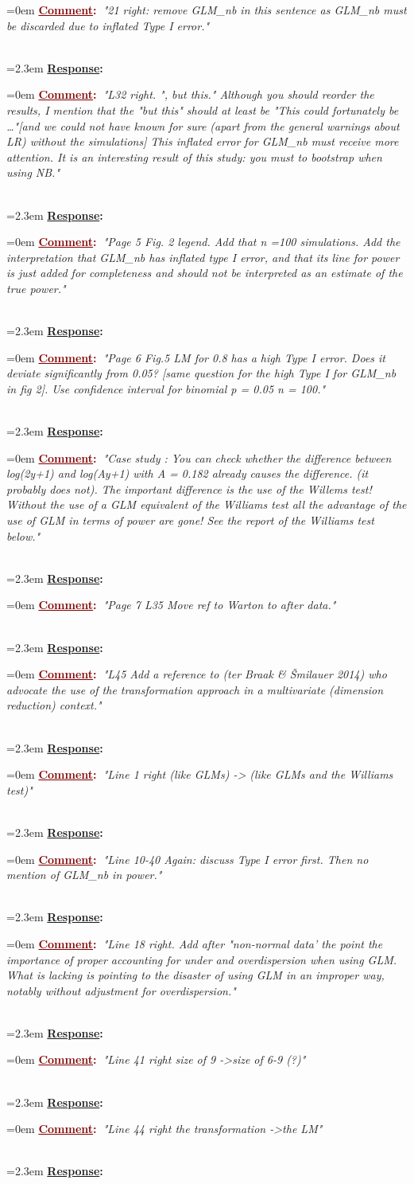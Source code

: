 \documentclass[12pt]{article}
\newcommand{\comment}[1]{
	\vspace{2em} \noindent \hangindent=0em \textbf{\textcolor{Maroon}{\uline{Comment}:~}}\emph{"#1"}
	}
\newcommand{\response}[1]{
	\\[0.25em] 
	\hangindent=2.3em \textbf{\textcolor{NavyBlue}{\uline{Response}:~}}#1 
	}
\begin{document}
\comment{21 right: remove GLM\_nb in this sentence as GLM\_nb must be discarded due to inflated Type I error.}
\response{}

\comment{L32 right. ", but this." Although you should reorder the results, I mention that the "but this" should at least be "This could fortunately be …"[and we could not have known for sure (apart from the general warnings about LR) without the simulations] This inflated error for GLM\_nb must receive more attention. It is an interesting result of this study: you must to bootstrap when using NB.}
\response{}

\comment{Page 5
Fig. 2 legend. Add that n =100 simulations. Add the interpretation that  GLM\_nb has inflated type I error, and that its line for power is just added for completeness and should not be interpreted as an estimate of the true power.}
\response{}

\comment{Page 6
Fig.5 LM for 0.8 has a high Type I error. Does it deviate significantly from 0.05? [same question for the high Type I for GLM\_nb in fig 2]. Use confidence interval for binomial p = 0.05 n = 100.}
\response{}

\comment{Case study : 
You can check whether the difference between log(2y+1) and log(Ay+1) with A = 0.182 already causes the difference. (it probably does not). The important difference is the use of the Willems test! Without the use of a GLM equivalent of the Williams test all the advantage of the use of GLM in terms of power are gone! See the report of the Williams test below.}
\response{}

\comment{Page 7 L35 Move ref to Warton to after data.}
\response{}

\comment{L45 Add a reference to (ter Braak \& Šmilauer 2014) who advocate the use of the transformation approach in a multivariate (dimension reduction) context.}
\response{}

\comment{Line 1 right (like GLMs) -> (like GLMs and the Williams test)}
\response{}

\comment{Line 10-40 Again: discuss Type I error first. Then no mention of GLM\_nb in power.}
\response{}

\comment{Line 18 right. Add after "non-normal data' the point the importance of proper accounting for under and overdispersion when using GLM. What is lacking is pointing to the disaster of using GLM in an improper way, notably without adjustment for overdispersion.}
\response{}

\comment{Line 41 right size of 9 -\textgreater size of 6-9 (?)}
\response{}

\comment{Line 44 right the transformation -\textgreater the LM}
\response{}



\end{document}
